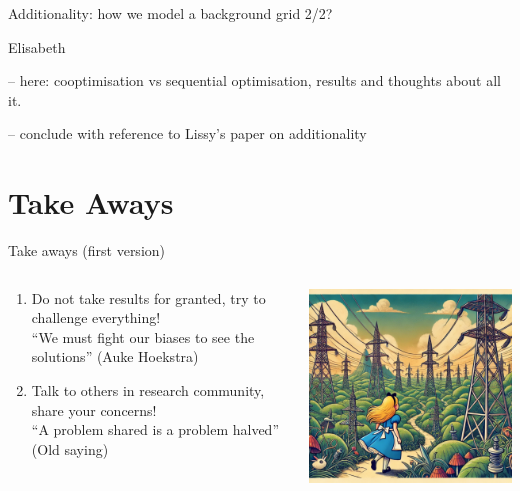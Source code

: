 \begin{frame}{Additionality: how we model a background grid 2/2?}

  Elisabeth

  -- here: cooptimisation vs sequential optimisation, results and thoughts about all it.

  -- conclude with reference to Lissy's paper on additionality

\end{frame}

\section{Take Aways}
\begin{frame}{Take aways (first version)}

\begin{columns}
\begin{column}{7cm}
  \begin{enumerate}
    \item Do not take results for granted, try to challenge everything! \\
    \enquote{We must fight our biases to see the solutions} (Auke Hoekstra)
    \item Talk to others in research community, share your concerns! \\
    \enquote{A problem shared is a problem halved} (Old saying)
  \end{enumerate}
\end{column}
\begin{column}{8cm}
  \includegraphics[width=8cm]{images/alice.png}
\end{column}
\end{columns}


\end{frame}

